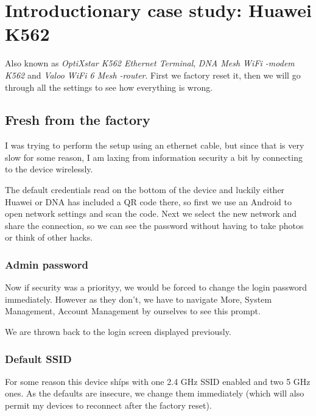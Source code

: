 \documentclass[../wifi-security.tex]{subfiles}
\begin{document}
\chapter{Introductionary case study: Huawei K562}

Also known as \textit{OptiXstar K562 Ethernet Terminal}, \textit{DNA Mesh WiFi -modem K562} and \textit{Valoo WiFi 6 Mesh -router}. First we factory reset it, then we will go through all the settings to see how everything is wrong.


\section{Fresh from the factory}

I was trying to perform the setup using an ethernet cable, but since that is very slow for some reason, I am laxing from information security a bit by connecting to the device wirelessly.



The default credentials read on the bottom of the device and luckily either Huawei or DNA has included a QR code there, so first we use an Android to open network settings and scan the code. Next we select the new network and share the connection, so we can see the password without having to take photos or think of other hacks.


\subsection{Admin password}


Now if security was a priorityy, we would be forced to change the login password immediately. However as they don't, we have to navigate More, System Management, Account Management by ourselves to see this prompt.

We are thrown back to the login screen displayed previously.

\subsection{Default SSID}

For some reason this device shíps with one 2.4 GHz SSID enabled and two 5 GHz ones. As the defaults are insecure, we change them immediately (which will also permit my devices to reconnect after the factory reset).
\end{document}
